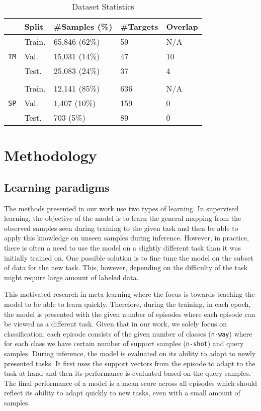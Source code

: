 \documentclass{article}
\begin{document}
\begin{table}[h]
    \centering
    \caption{Dataset Statistics}
    \label{tab:data}
    \begin{tabular}{lllll}
        \toprule
        & \textbf{Split} & \textbf{\#Samples} (\%) & \textbf{\#Targets} & \textbf{Overlap} \\
        \midrule
        \multirow{3}{*}{\texttt{TM}} 
        & Train. & 65,846 (62\%) & 59 & N/A \\
        & Val. & 15,031 (14\%) & 47 & 10 \\
        & Test. & 25,083 (24\%) & 37 & 4 \\
        \\
        \multirow{3}{*}{\texttt{SP}} 
        & Train. & 12,141 (85\%) & 636 & N/A \\
        & Val. & 1,407 (10\%) & 159 & 0 \\
        & Test. & 703 (5\%) & 89 & 0 \\
        \bottomrule
    \end{tabular}
\end{table}


\section{Methodology}
\subsection{Learning paradigms}
The methods presented in our work use two types of learning. In supervised learning, the objective of the model is to learn the general mapping from the observed samples seen during training to the given task and then be able to apply this knowledge on unseen samples during inference. However, in practice, there is often a need to use the model on a slightly different task than it was initially trained on. One possible solution is to fine tune the model on the subset of data for the new task. This, however, depending on the difficulty of the task might require large amount of labeled data. 

This motivated research in meta learning where the focus is towards teaching the model to be able to learn quickly. Therefore, during the training, in each epoch, the model is presented with the given number of episodes where each episode can be viewed as a different task. Given that in our work, we solely focus on classification, each episode consists of the given number of classes (\texttt{n-way}) where for each class we have certain number of support samples (\texttt{n-shot}) and query samples. During inference, the model is evaluated on its ability to adapt to newly presented tasks.  It first uses the support vectors from the episode to adapt to the task at hand and then its performance is evaluated based on the query samples. The final performance of a model is a mean score across all episodes which should reflect its ability to adapt quickly to new tasks, even with a small amount of samples.
\end{document}
